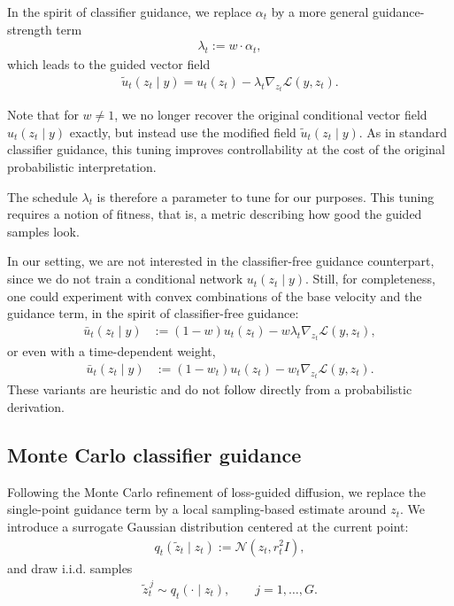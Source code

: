\documentclass[a4paper,12pt]{article}
\begin{document}
In the spirit of classifier guidance, we replace $\alpha_t$ by a more general guidance-strength term
\begin{align*}
    \lambda_t := w \cdot \alpha_t,
\end{align*}
which leads to the guided vector field
\begin{align*}
    \tilde{u}_t(z_t \mid y) = u_t(z_t) - \lambda_t \nabla_{z_t}\mathcal{L}(y, z_t).
\end{align*}

Note that for $w \neq 1$, we no longer recover the original conditional vector field $u_t(z_t \mid y)$ exactly, but instead use the modified field $\tilde{u}_t(z_t \mid y)$.
As in standard classifier guidance, this tuning improves controllability at the cost of the original probabilistic interpretation.

The schedule $\lambda_t$ is therefore a parameter to tune for our purposes.
This tuning requires a notion of fitness, that is, a metric describing how good the guided samples look.

In our setting, we are not interested in the classifier-free guidance counterpart, since we do not train a conditional network $u_t(z_t \mid y)$.
Still, for completeness, one could experiment with convex combinations of the base velocity and the guidance term, in the spirit of classifier-free guidance:
\begin{align*}
    \bar{u}_t(z_t \mid y)
    &:= (1-w)u_t(z_t) - w \lambda_t \nabla_{z_t}\mathcal{L}(y, z_t),
\end{align*}
or even with a time-dependent weight,
\begin{align*}
    \bar{u}_t(z_t \mid y)
    &:= (1-w_t)u_t(z_t) - w_t \nabla_{z_t}\mathcal{L}(y, z_t).
\end{align*}
These variants are heuristic and do not follow directly from a probabilistic derivation.



\subsection{Monte Carlo classifier guidance}

Following the Monte Carlo refinement of loss-guided diffusion, we replace the single-point guidance term by a local sampling-based estimate around $z_t$.
We introduce a surrogate Gaussian distribution centered at the current point:
\begin{align*}
q_t(\tilde{z}_t \mid z_t) := \mathcal{N}(z_t, r_t^2 I),
\end{align*}
and draw i.i.d. samples
\begin{align*}
\tilde{z}_t^{\,j} \sim q_t(\cdot \mid z_t), \qquad j=1,\dots,G.
\end{align*}
\end{document}
